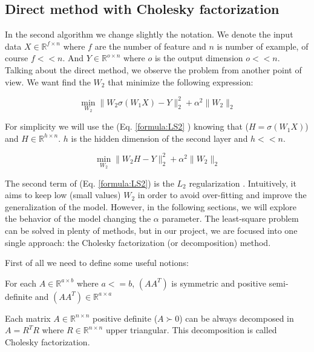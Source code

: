 \subsection{Direct method with Cholesky factorization}
In the second algorithm we change slightly the notation. We denote the input data $X \in \mathbb{R}^{f \times n}$ where $f$ are the number of feature and $n$ is number of example, of course $f << n$. And $Y \in \mathbb{R}^{o \times n}$ where $o$ is the output dimension $o << n$. Talking about the direct method, we observe the problem from another point of view. We want find the $W_2$ that minimize the following expression:

\begin{equation}
\label{formula:LS1}
\min_{W_2} \|W_2\sigma(W_1X) - Y\|_2^2  + \alpha^2\|W_2\|_2
\end{equation}

For simplicity we will use the (Eq. \ref{formula:LS2}       ) knowing that ($H = \sigma(W_1X)$) and $H \in \mathbb{R}^{h \times n}$. $h$ is the hidden dimension of the second layer and $h << n$.

\begin{equation}
\label{formula:LS2}
\min_{W_2} \|W_2H- Y\|_2^2  + \alpha^2\|W_2\|_2
\end{equation}


The second term of (Eq. \ref{formula:LS2}) is the $L_2$ regularization \cite{ridge_reg}. Intuitively, it aims to keep low (small values) $W_2$ in order to avoid over-fitting and improve the generalization of the model. However, in the following sections, we will explore the behavior of the model changing the $\alpha$ parameter. The least-square problem can be solved in plenty of methods, but in our project, we are focused into one single approach: the Cholesky factorization (or decomposition) method.

First of all we need to define some useful notions:
\begin{definition}
    \label{def:a_trasposea}
    For each $A \in \mathbb{R}^{ a \times b}$ where $a <= b$, $(AA^T)$ is symmetric and positive semi-definite and $(AA^T) \in \mathbb{R}^{ a \times a}$
\end{definition}
\begin{theorem}
    \label{th:th_choleksy}
    Each matrix $A \in \mathbb{R}^{ n \times n}$ positive definite ($A \succ 0$) can be always decomposed in $ A = R^TR$ where $R \in \mathbb{R}^{n \times n}$ upper triangular. This decomposition is called Cholesky factorization.
\end{theorem} 



